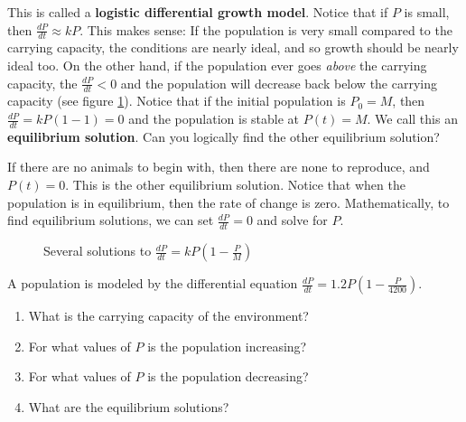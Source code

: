 This is called a \textbf{logistic differential growth model}. Notice that if $P$ is small, then $\frac{dP}{dt} 
\approx kP$. This makes sense: If the population is very small compared to the 
carrying capacity, the conditions are nearly ideal, and so growth should be 
nearly ideal too. On the other hand, if the population ever goes \textit{
above} the carrying capacity, the $\frac{dP}{dt} < 0$ and the population will 
decrease back below the carrying capacity (see figure \ref{logdiff}). Notice 
that if the initial population is $P_0 = M$, then $\frac{dP}{dt} = kP \left( 1 
- 1 \right) = 0$ and the population is stable at $P(t) = M$. We call this an 
\textbf{equilibrium solution}. Can you logically 
find the other equilibrium solution? 

If there are no animals to begin with, then there are none to reproduce, and 
$P(t) = 0$. This is the other equilibrium solution. Notice that when the 
population is in equilibrium, then the rate of change is zero. Mathematically, 
to find equilibrium solutions, we can set $\frac{dP}{dt} = 0$ and solve for $P$. 

\begin{figure}[H]
\centering
    \caption{Several solutions to $\frac{dP}{dt} = kP \left( 1 - \frac{P}{M} 
    \right)$}
    \label{logdiff}
\end{figure}

\begin{Exercise}[label = logdiff1]
A population is modeled by the differential equation $\frac{dP}{dt} = 1.2P 
\left( 1 - \frac{P}{4200} \right)$.
\begin{enumerate}
\item What is the carrying capacity of the environment?
\item For what values of $P$ is the population increasing?
\item For what values of $P$ is the population decreasing?
\item What are the equilibrium solutions?
\end{enumerate}
\end{Exercise}

